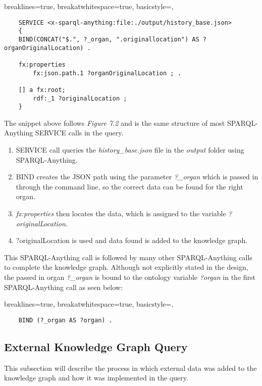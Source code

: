 \lstset
{
    breaklines=true,
    breakatwhitespace=true,
    basicstyle=\ttfamily,
}
\begin{lstlisting}
    SERVICE <x-sparql-anything:file:./output/history_base.json> 
    {
    BIND(CONCAT("$.", ?_organ, ".originallocation") AS ?organOriginalLocation) .

    fx:properties
        fx:json.path.1 ?organOriginalLocation ; .

    [] a fx:root; 
        rdf:_1 ?originalLocation ;
    } 
\end{lstlisting}

The snippet above follows \textit{Figure 7.2} and is the same structure of most SPARQL-Anything SERVICE calls in the query. 

\begin{enumerate}
    \item SERVICE call queries the \textit{history\_base.json} file in the \textit{output} folder using SPARQL-Anything. 
    \item BIND creates the JSON path using the parameter \textit{?\_organ} which is passed in through the command line, so the correct data can be found for the right organ. 
    \item \textit{fx:properties} then locates the data, which is assigned to the variable \textit{?originalLocation}. 
    \item ?originalLocation is used and data found is added to the knowledge graph.
\end{enumerate}

This SPARQL-Anything call is followed by many other SPARQL-Anything calls to complete the knowledge graph. Although not explicitly stated in the design, the passed in organ \textit{?\_organ} is bound to the ontology variable \textit{?organ} in the first SPARQL-Anything call as seen below:

\lstset
{
    breaklines=true,
    breakatwhitespace=true,
    basicstyle=\ttfamily,
}
\begin{lstlisting}
    BIND (?_organ AS ?organ) .
\end{lstlisting}

\subsection{External Knowledge Graph Query}
\hspace*{0.5cm} This subsection will describe the process in which external data was added to the knowledge graph and how it was implemented in the query. 

